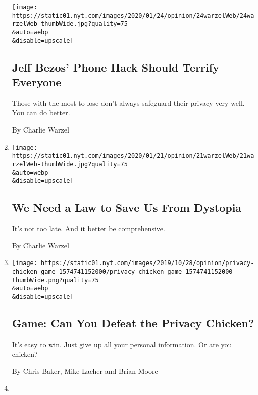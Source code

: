 \begin{enumerate}
  \texttt{[image: https://static01.nyt.com/images/2020/01/24/opinion/24warzelWeb/24warzelWeb-thumbWide.jpg?quality=75\\\&auto=webp\\\&disable=upscale]}

  \hypertarget{jeff-bezos-phone-hack-should-terrify-everyone}{%
  \subsection{Jeff Bezos' Phone Hack Should Terrify
  Everyone}\label{jeff-bezos-phone-hack-should-terrify-everyone}}

  Those with the most to lose don't always safeguard their privacy very
  well. You can do better.

  By Charlie Warzel
\item
  \href{/2020/01/21/opinion/facial-recognition-privacy-law.html}{}

  \texttt{[image: https://static01.nyt.com/images/2020/01/21/opinion/21warzelWeb/21warzelWeb-thumbWide.jpg?quality=75\\\&auto=webp\\\&disable=upscale]}

  \hypertarget{we-need-a-law-to-save-us-from-dystopia}{%
  \subsection{We Need a Law to Save Us From
  Dystopia}\label{we-need-a-law-to-save-us-from-dystopia}}

  It's not too late. And it better be comprehensive.

  By Charlie Warzel
\item
  \href{/interactive/2020/01/21/opinion/privacy-chicken-game.html}{}

  \texttt{[image: https://static01.nyt.com/images/2019/10/28/opinion/privacy-chicken-game-1574741152000/privacy-chicken-game-1574741152000-thumbWide.png?quality=75\\\&auto=webp\\\&disable=upscale]}

  \hypertarget{game-can-you-defeat-the-privacy-chicken}{%
  \subsection{Game: Can You Defeat the Privacy
  Chicken?}\label{game-can-you-defeat-the-privacy-chicken}}

  It's easy to win. Just give up all your personal information. Or are
  you chicken?

  By Chris Baker, Mike Lacher and Brian Moore
\item
  \href{/2020/01/20/opinion/facial-recognition-ban-privacy.html}{}


\end{enumerate}

